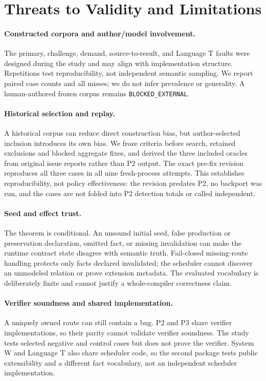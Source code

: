 \section{Threats to Validity and Limitations}
\paragraph{Constructed corpora and author/model involvement.}
The primary, challenge, demand, source-to-result, and Language T faults were designed during the study and may align with implementation structure. Repetitions test reproducibility, not independent semantic sampling. We report paired case counts and all misses; we do not infer prevalence or generality. A human-authored frozen corpus remains \texttt{BLOCKED\_EXTERNAL}.

\paragraph{Historical selection and replay.}
A historical corpus can reduce direct construction bias, but author-selected inclusion introduces its own bias. We froze criteria before search, retained exclusions and blocked aggregate fixes, and derived the three included oracles from original issue reports rather than P2 output. The exact pre-fix revision reproduces all three cases in all nine fresh-process attempts. This establishes reproducibility, not policy effectiveness: the revision predates P2, no backport was run, and the cases are not folded into P2 detection totals or called independent.

\paragraph{Seed and effect trust.}
The theorem is conditional. An unsound initial seed, false production or preservation declaration, omitted fact, or missing invalidation can make the runtime contract state disagree with semantic truth. Fail-closed missing-route handling protects only facts declared invalidated; the scheduler cannot discover an unmodeled relation or prove extension metadata. The evaluated vocabulary is deliberately finite and cannot justify a whole-compiler correctness claim.

\paragraph{Verifier soundness and shared implementation.}
A uniquely owned route can still contain a bug. P2 and P3 share verifier implementations, so their parity cannot validate verifier soundness. The study tests selected negative and control cases but does not prove the verifier.  System W and Language T also share scheduler code, so the second package tests public extensibility and a different fact vocabulary, not an independent scheduler implementation.

